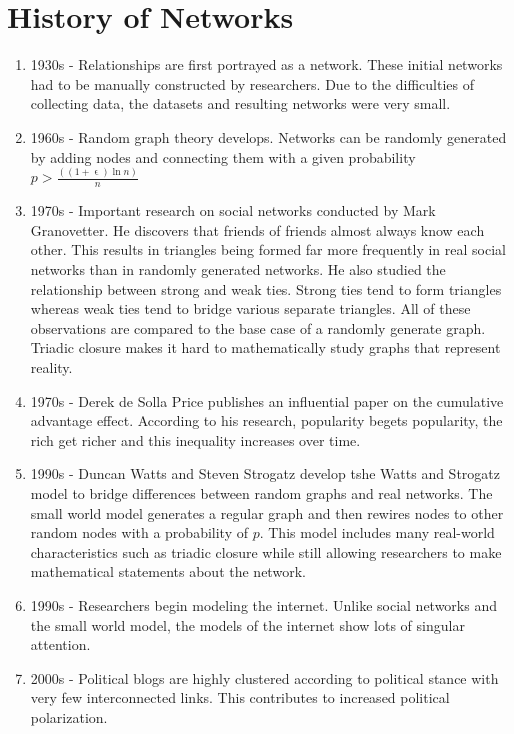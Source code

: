 

\section{History of Networks}

\begin{enumerate}
	\item 1930s - Relationships are first portrayed as a network. These initial networks had to be manually constructed by researchers. Due to the difficulties of collecting data, the datasets and resulting networks were very small.
	\item 1960s - Random graph theory develops. Networks can be randomly generated by adding nodes and connecting them with a given probability $p > \frac{((1 + \upvarepsilon) \ln n)}{n}$
	\item 1970s - Important research on social networks conducted by Mark Granovetter. He discovers that friends of friends almost always know each other. This results in triangles being formed far more frequently in real social networks than in randomly generated networks. He also studied the relationship between strong and weak ties. Strong ties tend to form triangles whereas weak ties tend to bridge various separate triangles. All of these observations are compared to the base case of a randomly generate graph. Triadic closure makes it hard to mathematically study graphs that represent reality.
	\item 1970s - Derek de Solla Price publishes an influential paper on the cumulative advantage effect. According to his research, popularity begets popularity, the rich get richer and this inequality increases over time.
	\item 1990s - Duncan Watts and Steven Strogatz develop tshe Watts and Strogatz model to bridge differences between random graphs and real networks. The small world model generates a regular graph and then rewires nodes to other random nodes with a probability of $p$. This model includes many real-world characteristics such as triadic closure while still allowing researchers to make mathematical statements about the network.
	\item 1990s - Researchers begin modeling the internet. Unlike social networks and the small world model, the models of the internet show lots of singular attention.
	\item 2000s - Political blogs are highly clustered according to political stance with very few interconnected links. This contributes to increased political polarization.
\end{enumerate}


